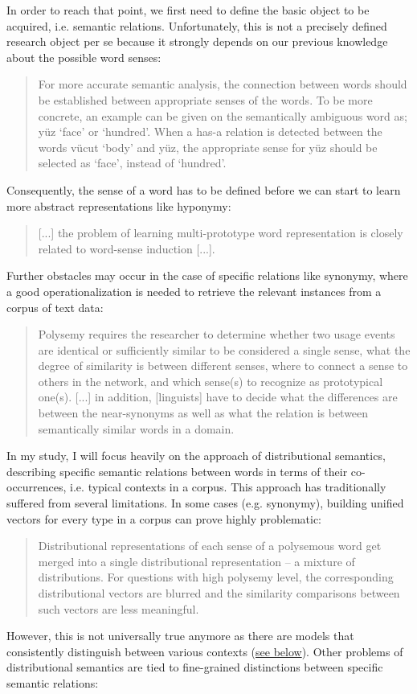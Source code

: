 \documentclass[jou]{apa6} %
\begin{document}
In order to reach that point, we first need to define the basic object to be acquired, i.e. semantic relations. Unfortunately, this is not a precisely defined research object per se because it strongly depends on our previous knowledge about the possible word senses:
\blockquote[{\cite[p.~12]{ayseExtractionSemanticWord2011}}]{For more accurate semantic analysis, the connection between words should be established between appropriate senses of the words. To be more concrete, an example can be given on the semantically ambiguous word as; yüz ‘face’ or ‘hundred’. When a has-a relation is detected between the words vücut ‘body’ and yüz, the appropriate sense for yüz should be selected as ‘face’, instead of ‘hundred’.}
Consequently, the sense of a word has to be defined before we can start to learn more abstract representations like hyponymy:
\blockquote[{\cite[p.~137]{bartunovBreakingSticksAmbiguities2016}}]{[...] the problem of learning multi-prototype word representation is closely related to word-sense induction [...].}
Further obstacles may occur in the case of specific relations like synonymy, where a good operationalization is needed to retrieve the relevant instances from a corpus of text data:
\blockquote[{\cite[p.~274]{divjakCorpusbasedCognitiveSemantics2009}}]{Polysemy requires the researcher to determine whether two usage events are identical or sufficiently similar to be considered a single sense, what the degree of similarity is between different senses, where to connect a sense to others in the network, and which sense(s) to recognize as prototypical one(s). [...] in addition, [linguists] have to decide what the differences are between the near-synonyms as well as what the relation is between semantically similar words in a domain.}
In my study, I will focus heavily on the approach of distributional semantics, describing specific semantic relations between words in terms of their co-occurrences, i.e. typical contexts in a corpus. This approach has traditionally suffered from several limitations. In some cases (e.g. synonymy), building unified vectors for every type in a corpus can prove highly problematic:
\blockquote[{\cite[p.~114]{karanDistributionalSemanticsApproach2012}}]{Distributional representations of each sense of a polysemous word get merged into a single distributional representation – a mixture of distributions. For questions with high polysemy level, the corresponding distributional vectors are blurred and the similarity comparisons between such vectors are less meaningful.}
However, this is not universally true anymore as there are models that consistently distinguish between various contexts (\hyperlink{ELMO}{see below}). Other problems of distributional semantics are tied to fine-grained distinctions between specific semantic relations:
\end{document}
